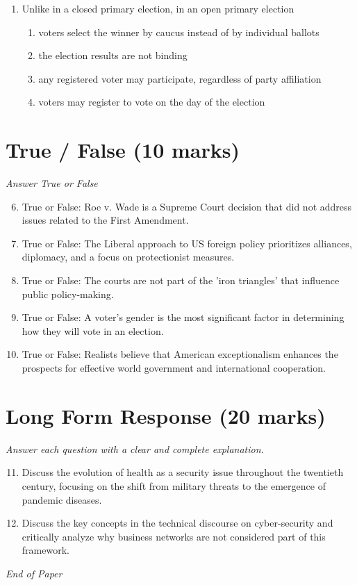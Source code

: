 \documentclass[12pt]{article}
\begin{document}
\begin{enumerate}[label=\arabic*.]
\begin{enumerate}[label=(\alph*)]
    \item vice president
    \item president's chief of staff
    \item national security advisor
    \item chair of the Federal Reserve Board
\end{enumerate}
\item Unlike in a closed primary election, in an open primary election
\begin{enumerate}[label=(\alph*)]
    \item voters select the winner by caucus instead of by individual ballots
    \item the election results are not binding
    \item any registered voter may participate, regardless of party affiliation
    \item voters may register to vote on the day of the election
\end{enumerate}
\end{enumerate}

\section*{True / False (10 marks)}
\textit{Answer True or False}
\begin{enumerate}[label=\arabic*.]
\setcounter{enumi}{5}
\item True or False: Roe v. Wade is a Supreme Court decision that did not address issues related to the First Amendment.
\item True or False: The Liberal approach to US foreign policy prioritizes alliances, diplomacy, and a focus on protectionist measures.
\item True or False: The courts are not part of the 'iron triangles' that influence public policy-making.
\item True or False: A voter's gender is the most significant factor in determining how they will vote in an election.
\item True or False: Realists believe that American exceptionalism enhances the prospects for effective world government and international cooperation.
\end{enumerate}

\section*{Long Form Response (20 marks)}
\textit{Answer each question with a clear and complete explanation.}
\begin{enumerate}[label=\arabic*.]
\setcounter{enumi}{10}
\item Discuss the evolution of health as a security issue throughout the twentieth century, focusing on the shift from military threats to the emergence of pandemic diseases.
\item Discuss the key concepts in the technical discourse on cyber-security and critically analyze why business networks are not considered part of this framework.
\end{enumerate}

\vfill
\noindent\textit{End of Paper}
\end{document}
